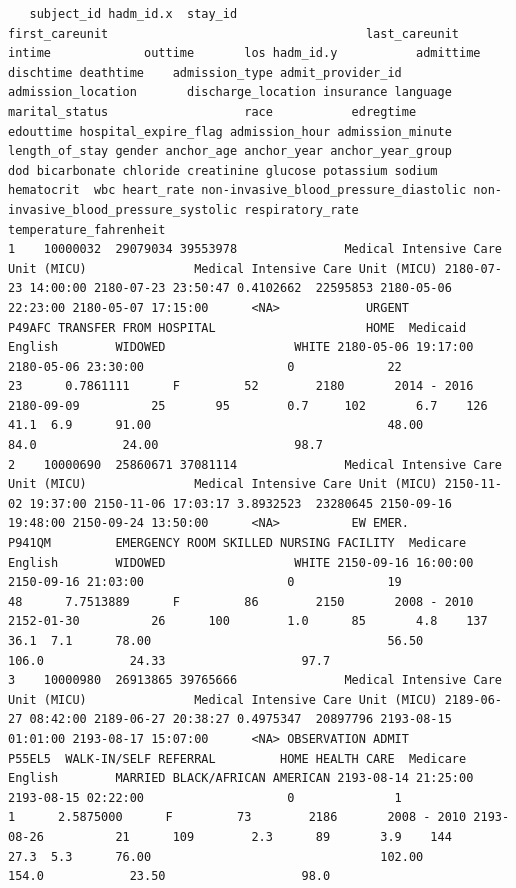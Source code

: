 \documentclass[
]{article}
\begin{document}
\begin{verbatim}
   subject_id hadm_id.x  stay_id                                   first_careunit                                    last_careunit              intime             outtime       los hadm_id.y           admittime           dischtime deathtime    admission_type admit_provider_id     admission_location       discharge_location insurance language marital_status                   race           edregtime           edouttime hospital_expire_flag admission_hour admission_minute length_of_stay gender anchor_age anchor_year anchor_year_group        dod bicarbonate chloride creatinine glucose potassium sodium hematocrit  wbc heart_rate non-invasive_blood_pressure_diastolic non-invasive_blood_pressure_systolic respiratory_rate temperature_fahrenheit
1    10000032  29079034 39553978               Medical Intensive Care Unit (MICU)               Medical Intensive Care Unit (MICU) 2180-07-23 14:00:00 2180-07-23 23:50:47 0.4102662  22595853 2180-05-06 22:23:00 2180-05-07 17:15:00      <NA>            URGENT            P49AFC TRANSFER FROM HOSPITAL                     HOME  Medicaid  English        WIDOWED                  WHITE 2180-05-06 19:17:00 2180-05-06 23:30:00                    0             22               23      0.7861111      F         52        2180       2014 - 2016 2180-09-09          25       95        0.7     102       6.7    126       41.1  6.9      91.00                                 48.00                                 84.0            24.00                   98.7
2    10000690  25860671 37081114               Medical Intensive Care Unit (MICU)               Medical Intensive Care Unit (MICU) 2150-11-02 19:37:00 2150-11-06 17:03:17 3.8932523  23280645 2150-09-16 19:48:00 2150-09-24 13:50:00      <NA>          EW EMER.            P941QM         EMERGENCY ROOM SKILLED NURSING FACILITY  Medicare  English        WIDOWED                  WHITE 2150-09-16 16:00:00 2150-09-16 21:03:00                    0             19               48      7.7513889      F         86        2150       2008 - 2010 2152-01-30          26      100        1.0      85       4.8    137       36.1  7.1      78.00                                 56.50                                106.0            24.33                   97.7
3    10000980  26913865 39765666               Medical Intensive Care Unit (MICU)               Medical Intensive Care Unit (MICU) 2189-06-27 08:42:00 2189-06-27 20:38:27 0.4975347  20897796 2193-08-15 01:01:00 2193-08-17 15:07:00      <NA> OBSERVATION ADMIT            P55EL5  WALK-IN/SELF REFERRAL         HOME HEALTH CARE  Medicare  English        MARRIED BLACK/AFRICAN AMERICAN 2193-08-14 21:25:00 2193-08-15 02:22:00                    0              1                1      2.5875000      F         73        2186       2008 - 2010 2193-08-26          21      109        2.3      89       3.9    144       27.3  5.3      76.00                                102.00                                154.0            23.50                   98.0

\end{verbatim}
\end{document}

